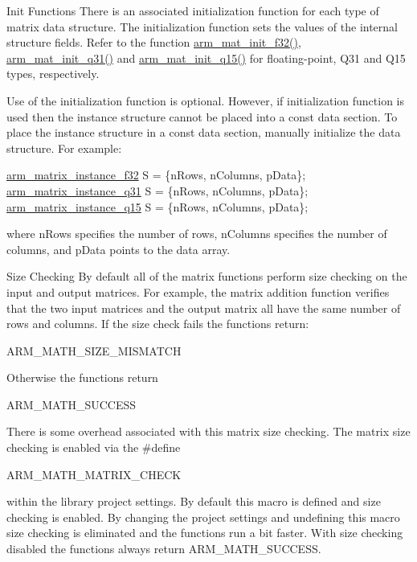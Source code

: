 \begin{DoxyParagraph}{Init Functions}
There is an associated initialization function for each type of matrix data structure. The initialization function sets the values of the internal structure fields. Refer to the function {\ttfamily \hyperlink{group___matrix_init_ga11e3dc41592a6401c13182fef9416a27}{arm\-\_\-mat\-\_\-init\-\_\-f32()}}, {\ttfamily \hyperlink{group___matrix_init_ga48a5e5d37e1f062cc57fcfaf683343cc}{arm\-\_\-mat\-\_\-init\-\_\-q31()}} and {\ttfamily \hyperlink{group___matrix_init_ga31a7c2b991803d49719393eb2d53dc26}{arm\-\_\-mat\-\_\-init\-\_\-q15()}} for floating-\/point, Q31 and Q15 types, respectively.
\end{DoxyParagraph}
\begin{DoxyParagraph}{}
Use of the initialization function is optional. However, if initialization function is used then the instance structure cannot be placed into a const data section. To place the instance structure in a const data section, manually initialize the data structure. For example\-: 
\begin{DoxyPre}
{\ttfamily \hyperlink{structarm__matrix__instance__f32}{arm\_matrix\_instance\_f32} S = \{nRows, nColumns, pData\};}
{\ttfamily \hyperlink{structarm__matrix__instance__q31}{arm\_matrix\_instance\_q31} S = \{nRows, nColumns, pData\};}
{\ttfamily \hyperlink{structarm__matrix__instance__q15}{arm\_matrix\_instance\_q15} S = \{nRows, nColumns, pData\};}
\end{DoxyPre}
 where {\ttfamily n\-Rows} specifies the number of rows, {\ttfamily n\-Columns} specifies the number of columns, and {\ttfamily p\-Data} points to the data array.
\end{DoxyParagraph}
\begin{DoxyParagraph}{Size Checking}
By default all of the matrix functions perform size checking on the input and output matrices. For example, the matrix addition function verifies that the two input matrices and the output matrix all have the same number of rows and columns. If the size check fails the functions return\-: 
\begin{DoxyPre}
    ARM\_MATH\_SIZE\_MISMATCH
\end{DoxyPre}
 Otherwise the functions return 
\begin{DoxyPre}
    ARM\_MATH\_SUCCESS
\end{DoxyPre}
 There is some overhead associated with this matrix size checking. The matrix size checking is enabled via the \#define 
\begin{DoxyPre}
    ARM\_MATH\_MATRIX\_CHECK
\end{DoxyPre}
 within the library project settings. By default this macro is defined and size checking is enabled. By changing the project settings and undefining this macro size checking is eliminated and the functions run a bit faster. With size checking disabled the functions always return {\ttfamily A\-R\-M\-\_\-\-M\-A\-T\-H\-\_\-\-S\-U\-C\-C\-E\-S\-S}. 
\end{DoxyParagraph}
